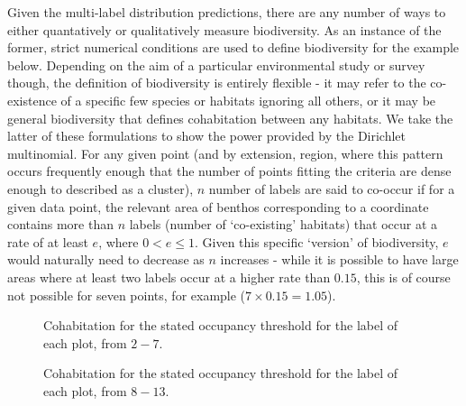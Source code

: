 Given the multi-label distribution predictions, there are any number of ways to either quantatively or qualitatively measure biodiversity. As an instance of the former, strict numerical conditions are used to define biodiversity for the example below. Depending on the aim of a particular environmental study or survey though, the definition of biodiversity is entirely flexible - it may refer to the co-existence of a specific few species or habitats ignoring all others, or it may be general biodiversity that defines cohabitation between any habitats. We take the latter of these formulations to show the power provided by the Dirichlet multinomial. For any given point (and by extension, region, where this pattern occurs frequently enough that the number of points fitting the criteria are dense enough to described as a cluster), $n$ number of labels are said to co-occur if for a given data point, the relevant area of benthos corresponding to a coordinate contains more than $n$ labels (number of `co-existing' habitats) that occur at a rate of at least $e$, where $0 < e \leq 1$. Given this specific `version' of biodiversity, $e$ would naturally need to decrease as $n$ increases - while it is possible to have large areas where at least two labels occur at a higher rate than $0.15$, this is of course not possible for seven points, for example ($7\times0.15=1.05$).


\begin{figure}
    \caption{Cohabitation for the stated occupancy threshold for the label of each plot, from $2-7$.}
\end{figure}

\begin{figure}
    \caption{Cohabitation for the stated occupancy threshold for the label of each plot, from $8-13$.}
\end{figure}

